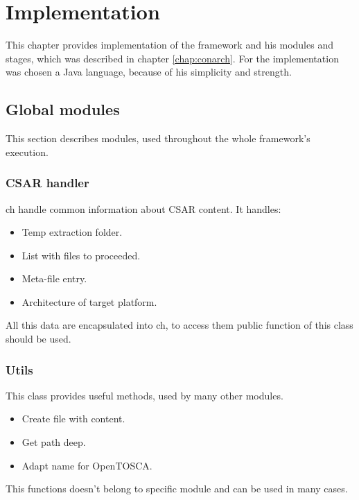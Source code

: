 
\chapter{Implementation}\label{chap:imp}
This chapter provides implementation of the framework and his modules and stages, which was described in chapter \ref{chap:conarch}.
For the implementation was chosen a Java language, because of his simplicity and strength. 

\section{Global modules}
This section describes modules, used throughout the whole framework's execution.

\subsection*{CSAR handler}
\gls{ch} handle common information about CSAR content.
It handles:
\begin{itemize}
	\item Temp extraction folder.
	\item List with files to proceeded.
	\item Meta-file entry.
	\item Architecture of target platform.
\end{itemize}
All this data are encapsulated into \gls{ch}, to access them public function of this class should be used.

\subsection*{Utils}
This class provides useful methods, used by many other modules.
\begin{itemize}
	\item Create file with content.
	\item Get path deep.
	\item Adapt name for OpenTOSCA.
\end{itemize}
This functions doesn't belong to specific module and can be used in many cases.

